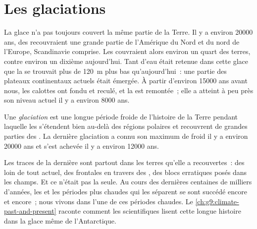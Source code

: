 \section{Les glaciations}

La glace n'a pas toujours couvert la même partie de la Terre. Il y a
environ \num{20000} ans, des  recouvraient une grande
partie de l'Amérique du Nord et du nord de l'Europe, Scandinavie comprise.
Les  couvraient alors environ un quart des terres, contre environ
un dixième aujourd'hui. Tant d'eau était retenue dans cette glace que la
 se trouvait plus de \qty{120}{m} plus bas qu'aujourd'hui~: une partie
des plateaux continentaux actuels était émergée. À partir d'environ
\num{15000} ans avant nous, les calottes ont fondu et reculé, et la  est
remontée~; elle a atteint à peu près son niveau actuel il y a environ
\num{8000} ans.

\begin{definition}[Glaciation]\label{def:g8:ice-on-earth:ice-age}
Une \emph{glaciation} est une longue période froide de l'histoire de la
Terre pendant laquelle les  s'étendent bien au-delà
des régions polaires et recouvrent de grandes parties des . La
dernière glaciation a connu son maximum de froid il y a environ
\num{20000} ans et s'est achevée il y a environ \num{12000} ans.
\end{definition}

Les traces de la dernière  sont partout dans les terres qu'elle
a recouvertes~: des  loin de tout  actuel, des 
frontales en travers des , des blocs erratiques posés dans les
champs. Et ce n'était pas la seule. Au cours des dernières centaines de
milliers d'années, les  et les périodes plus chaudes qui les
séparent se sont succédé encore et encore~; nous vivons dans l'une de ces
périodes chaudes. Le \cref{ch:g9:climate-past-and-present} raconte
comment les scientifiques lisent cette longue histoire dans la glace même
de l'Antarctique.


